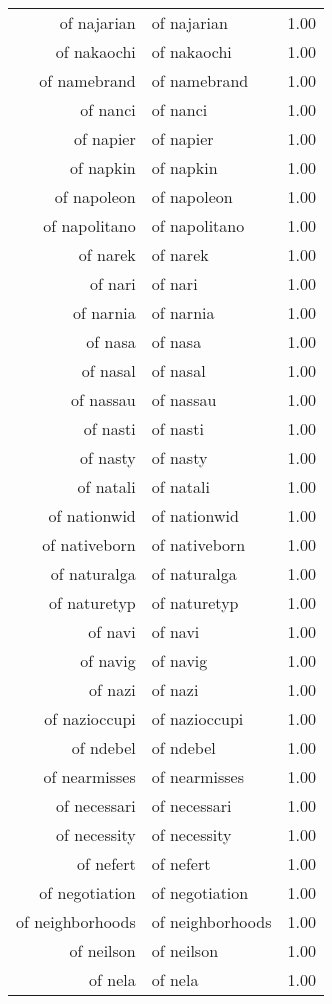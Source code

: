 \begin{table}[ht]
\begin{tabular}{rlr}
  of najarian & of najarian & 1.00 \\ 
  of nakaochi & of nakaochi & 1.00 \\ 
  of namebrand & of namebrand & 1.00 \\ 
  of nanci & of nanci & 1.00 \\ 
  of napier & of napier & 1.00 \\ 
  of napkin & of napkin & 1.00 \\ 
  of napoleon & of napoleon & 1.00 \\ 
  of napolitano & of napolitano & 1.00 \\ 
  of narek & of narek & 1.00 \\ 
  of nari & of nari & 1.00 \\ 
  of narnia & of narnia & 1.00 \\ 
  of nasa & of nasa & 1.00 \\ 
  of nasal & of nasal & 1.00 \\ 
  of nassau & of nassau & 1.00 \\ 
  of nasti & of nasti & 1.00 \\ 
  of nasty & of nasty & 1.00 \\ 
  of natali & of natali & 1.00 \\ 
  of nationwid & of nationwid & 1.00 \\ 
  of nativeborn & of nativeborn & 1.00 \\ 
  of naturalga & of naturalga & 1.00 \\ 
  of naturetyp & of naturetyp & 1.00 \\ 
  of navi & of navi & 1.00 \\ 
  of navig & of navig & 1.00 \\ 
  of nazi & of nazi & 1.00 \\ 
  of nazioccupi & of nazioccupi & 1.00 \\ 
  of ndebel & of ndebel & 1.00 \\ 
  of nearmisses & of nearmisses & 1.00 \\ 
  of necessari & of necessari & 1.00 \\ 
  of necessity & of necessity & 1.00 \\ 
  of nefert & of nefert & 1.00 \\ 
  of negotiation & of negotiation & 1.00 \\ 
  of neighborhoods & of neighborhoods & 1.00 \\ 
  of neilson & of neilson & 1.00 \\ 
  of nela & of nela & 1.00 \\ 

\end{tabular}
\end{table}
